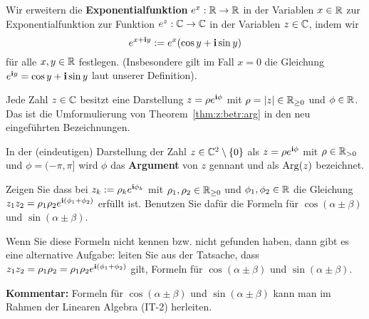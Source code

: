 \begin{defn}
	\label{def:euler:formel}
	Wir erweitern die \textbf{Exponentialfunktion} $e^x : \mathbb{R} \to \mathbb{R}$ in der Variablen $x \in \mathbb{R}$ zur Exponentialfunktion zur Funktion $e^z : \mathbb{C} \to \mathbb{C}$ in der Variablen $z \in \mathbb{C}$, indem wir 
	\[
			e^{x+ \mathbf{i} y} := e^x ( \cos y + \mathbf{i} \sin y)
	\]
	für alle $x, y \in \mathbb{R}$ festlegen. (Insbesondere gilt im Fall $x=0$ die Gleichung $e^{\mathbf{i} y} = \cos y + \mathbf{i} \sin y$ laut unserer Definition). 
\end{defn} 

\begin{bem}
	Jede Zahl $z \in \mathbb{C}$ besitzt eine Darstellung $z = \rho e^{\mathbf{i} \phi}$ mit $\rho = |z| \in \mathbb{R}_{\ge 0}$ und $\phi \in \mathbb{R}$. Das ist die Umformulierung von Theorem~\ref{thm:z:betr:arg} in den neu eingeführten Bezeichnungen. 
\end{bem} 

\begin{defn} 
	In der (eindeutigen) Darstellung  der Zahl $z \in \mathbb{C}^2 \setminus \{0\}$ als $z = \rho e^{\mathbf{i} \phi}$ mit $\rho \in \mathbb{R}_{>0}$ und $\phi = (-\pi,\pi]$  wird $\phi$ das \textbf{Argument} von $z$ gennant und als $\operatorname{Arg}(z)$ bezeichnet. 
\end{defn} 

\begin{aufg}
	Zeigen Sie dass bei $z_k := \rho_k e^{\mathbf{i} \phi_k}$ mit $\rho_1,\rho_2 \in \mathbb{R}_{\ge 0}$ und $\phi_1,\phi_2 \in \mathbb{R}$ die Gleichung $z_1 z_2 =  \rho_1 \rho_2 e^{\mathbf{i} (\phi_1 + \phi_2)}$ erfüllt ist.  Benutzen Sie dafür die Formeln für $\cos(\alpha \pm \beta)$ und $\sin(\alpha \pm \beta)$. 
	
	Wenn Sie diese Formeln nicht kennen bzw. nicht gefunden haben, dann gibt es eine alternative Aufgabe: leiten Sie aus der Tatsache, dass $z_1 z_2 = \rho_1 \rho_2 = \rho_1 \rho_2 e^{\mathbf{i}(\phi_1 + \phi_2)}$ gilt, Formeln für $\cos(\alpha \pm \beta)$ und $\sin(\alpha \pm \beta)$. 
	
	\textbf{Kommentar:} Formeln für $\cos(\alpha \pm \beta)$ und $\sin(\alpha \pm \beta)$ kann man im Rahmen der Linearen Algebra (IT-2) herleiten. 
\end{aufg} 

